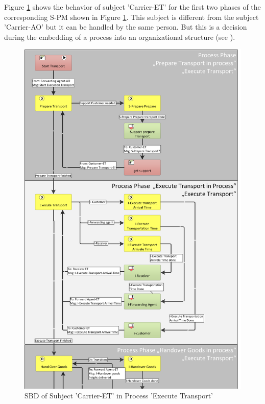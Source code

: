 Figure \ref{fig:SBD-Carrier-ET} shows the behavior of subject 'Carrier-ET' for the first two phases of the corresponding S-PM shown in Figure \ref{fig:SBD-Carrier-ET}. This subject is different from the subject 'Carrier-AO' but it can be handled by the same person. But this is a decision during the embedding of a process into an organizational structure (see \cite{book:flei2011}).


\begin{figure}[hbtp]
	\includegraphics[scale=0.7]{Figures/Chapter5/Subject-Phase/SBD-Carrier-ET_NEW.png}
	\caption{SBD of Subject 'Carrier-ET' in Process 'Execute Transport'}
	\label{fig:SBD-Carrier-ET}
\end{figure}


